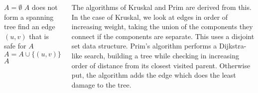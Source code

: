 \documentclass{tikzposter} %
\begin{document}
\begin{columns}
{  \begin{codebox}
    \li $A = \emptyset$
    \li \While $A$ does not form a spanning tree \Do
    \li     find an edge $(u,v)$ that is safe for $A$
    \li     $A = A \cup \{(u,v)\}$ \End
    \li \Return $A$
  \end{codebox}

  The algorithms of Kruskal and Prim are derived from this. In the case of Kruskal, we look at edges in order of increasing weight, taking the union of the components they connect if the components are separate. This uses a disjoint set data structure. Prim's algorithm performs a Dijkstra-like search, building a tree while checking in increasing order of distance from its closest visited parent. Otherwise put, the algorithm adds the edge which does the least damage to the tree. \\

}

\end{columns}
\end{document}
